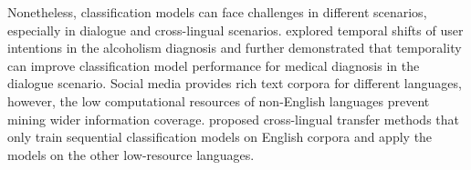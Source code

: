 Nonetheless, classification models can face challenges in different scenarios, especially in dialogue and cross-lingual scenarios. \cite{huang2018modeling} explored temporal shifts of user intentions in the alcoholism diagnosis and further demonstrated that temporality can improve classification model performance for medical diagnosis in the dialogue scenario.
Social media provides rich text corpora for different languages, however, the low computational resources of non-English languages prevent mining wider information coverage. 
\cite{huang2019matters} proposed cross-lingual transfer methods that only train sequential classification models on English corpora and apply the models on the other low-resource languages.
